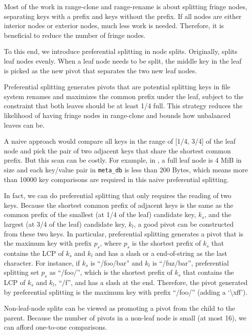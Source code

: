 Most of the work in range-clone and range-rename is about splitting fringe
nodes, separating keys with a prefix and keys without the prefix.
If all nodes are either interior nodes or exterior nodes, much less work is
needed.
Therefore, it is beneficial to reduce the number of fringe nodes.

To this end, we introduce preferential splitting in node splits.
Originally, \fti splits leaf nodes evenly.
When a leaf node needs to be split, the middle key in the leaf is picked as the
new pivot that separates the two new leaf nodes.

Preferential splitting generates pivots that are potential splitting keys in
file system renames and maximizes the common prefix under the leaf,
subject to the constraint that both leaves should be at least 1/4 full.
This strategy reduces the likelihood of having fringe nodes
in range-clone and bounds how unbalanced leaves can be.

A naive approach would compare all keys in the range of [1/4, 3/4] of the leaf
node and pick the pair of two adjacent keys that share the shortest common
prefix.
But this scan can be costly.
For example, in \betrfs, a full leaf node is 4 MiB in size and each key/value pair in
\texttt{meta\_db} is less than 200 Bytes, which means more than 10000 key
comparisons are required in this naive preferential splitting.

In fact, we can do preferential splitting that only requires the reading of two keys.
Because the shortest common prefix of adjacent keys is the same as the common
prefix of the smallest (at 1/4 of the leaf) candidate key, $k_{s}$, and
the largest (at 3/4 of the leaf) candidate key, $k_{l}$,
a good pivot can be constructed from these two keys.
In particular, preferential splitting generates a pivot that is the maximum key
with prefix $p_{s}$, where $p_{s}$ is the shortest prefix of $k_{s}$ that
contains the LCP of $k_{s}$ and $k_{l}$ and has a slash or a end-of-string as
the last character.
For instance, if $k_{s}$ is ``/foo/bar'' and $k_{l}$ is ``/fuz/bar'',
preferential splitting set $p_{s}$ as ``/foo/'', which is the shortest prefix
of $k_{s}$ that contains the LCP of $k_{s}$ and $k_{l}$, ``/f'', and has a
slash at the end.
Therefore, the pivot generated by preferential splitting is the maximum key with
prefix ``/foo/'' (adding a `\textbackslash xff').

Non-leaf-node splits can be viewed as promoting a pivot from the child to the
parent.
Because the number of pivots in a non-leaf node is small (at most 16), we can
afford one-to-one comparisons.

